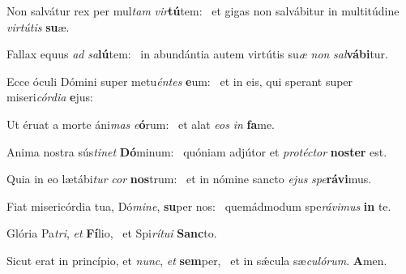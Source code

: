 \item Non salvátur rex per mul\textit{tam} \textit{vir}\textbf{tú}tem:~\psstar{} et gigas non salvábitur in multitúdine \textit{virtútis} \textbf{su}æ.
\item Fallax equus \textit{ad} \textit{sa}\textbf{lú}tem:~\psstar{} in abundántia autem virtútis su\textit{æ} \textit{non} \textit{sal}\textbf{vá}\textbf{bi}tur.
\item Ecce óculi Dómini super metu\textit{éntes} \textbf{e}um:~\psstar{} et in eis, qui sperant super miseri\textit{córdia} \textbf{e}jus:
\item Ut éruat a morte áni\textit{mas} \textit{e}\textbf{ó}rum:~\psstar{} et alat \textit{eos} \textit{in} \textbf{fa}me.
\item Anima nostra sús\textit{tinet} \textbf{Dó}minum:~\psstar{} quóniam adjútor et \textit{protéctor} \textbf{nos}\textbf{ter} est.
\item Quia in eo lætábi\textit{tur} \textit{cor} \textbf{nos}trum:~\psstar{} et in nómine sancto \textit{ejus} \textit{spe}\textbf{rá}\textbf{vi}mus.
\item Fiat misericórdia tua, Dó\textit{mine}, \textbf{su}per nos:~\psstar{} quemádmodum spe\textit{rávimus} \textbf{in} te.
\item Glória Pa\textit{tri}, \textit{et} \textbf{Fí}lio,~\psstar{} et Spi\textit{rítui} \textbf{Sanc}to.
\item Sicut erat in princípio, et \textit{nunc}, \textit{et} \textbf{sem}per,~\psstar{} et in sǽcula sæ\textit{culórum}. \textbf{A}men.
